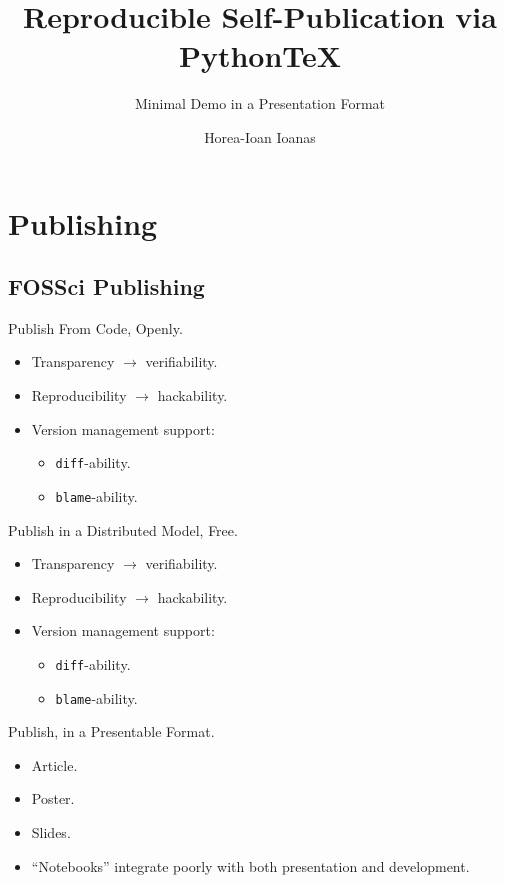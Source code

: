 
\title[Reproducible Self-Publication via Python\TeX\ --- Minimal Demo in a Presentation Format]{Reproducible Self-Publication via Python\TeX}
\subtitle{Minimal Demo in a Presentation Format}
\author{Horea-Ioan Ioanas}

	\begin{frame}
		\titlepage
	\end{frame}
	\section{Publishing}
		\subsection{FOSSci Publishing}
			\begin{frame}{Publish From Code, Openly.}
				\begin{itemize}
					\item Transparency $\longrightarrow$ verifiability.
					\item Reproducibility $\longrightarrow$ hackability.
					\item Version management support:
					\begin{itemize}
						\item \colorbox{tlg}{\texttt{diff}}-ability.
						\item \colorbox{tlg}{\texttt{blame}}-ability.
					\end{itemize}
				\end{itemize}
			\end{frame}
			\begin{frame}{Publish in a Distributed Model, Free.}
				\begin{itemize}
					\item Transparency $\longrightarrow$ verifiability.
					\item Reproducibility $\longrightarrow$ hackability.
					\item Version management support:
					\begin{itemize}
						\item \colorbox{tlg}{\texttt{diff}}-ability.
						\item \colorbox{tlg}{\texttt{blame}}-ability.
					\end{itemize}
				\end{itemize}
			\end{frame}
			\begin{frame}{Publish, in a Presentable Format.}
				\begin{itemize}
					\item Article.
					\item Poster.
					\item Slides.
					\item “Notebooks” integrate poorly with both presentation and development.
				\end{itemize}
			\end{frame}
